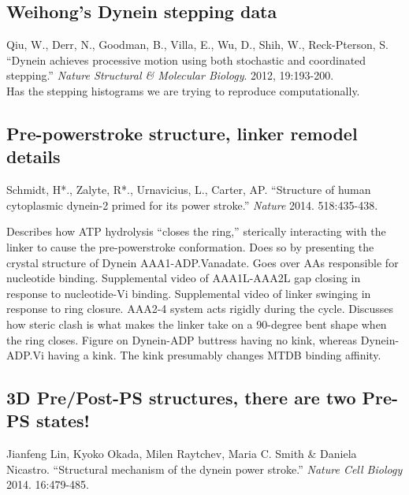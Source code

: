 \documentclass[10pt]{article} %
\begin{document}
\subsection{Weihong's Dynein stepping data}
Qiu, W., Derr, N., Goodman, B., Villa, E., Wu, D., Shih, W., Reck-Pterson, S. ``Dynein achieves processive motion using both stochastic and coordinated stepping.'' \textit{Nature Structural \& Molecular Biology}. 2012, 19:193-200.\\

Has the stepping histograms we are trying to reproduce computationally.

\subsection{Pre-powerstroke structure, linker remodel details}
Schmidt, H*., Zalyte, R*., Urnavicius, L., Carter, AP. ``Structure of human cytoplasmic dynein-2 primed for its power stroke.'' \textit{Nature} 2014. 518:435-438.

Describes how ATP hydrolysis ``closes the ring,'' sterically interacting with the linker to cause the pre-powerstroke conformation. Does so by presenting the crystal structure of Dynein AAA1-ADP.Vanadate. Goes over AAs responsible for nucleotide binding. Supplemental video of AAA1L-AAA2L gap closing in response to nucleotide-Vi binding. Supplemental video of linker swinging in response to ring closure. AAA2-4 system acts rigidly during the cycle. Discusses how steric clash is what makes the linker take on a 90-degree bent shape when the ring closes. Figure on Dynein-ADP buttress having no kink, whereas Dynein-ADP.Vi having a kink. The kink presumably changes MTDB binding affinity.

\subsection{3D Pre/Post-PS structures, there are two Pre-PS states!}
Jianfeng Lin, Kyoko Okada, Milen Raytchev, Maria C. Smith \& Daniela Nicastro. ``Structural mechanism of the dynein power stroke.'' \textit{Nature Cell Biology} 2014. 16:479-485.
\end{document}
